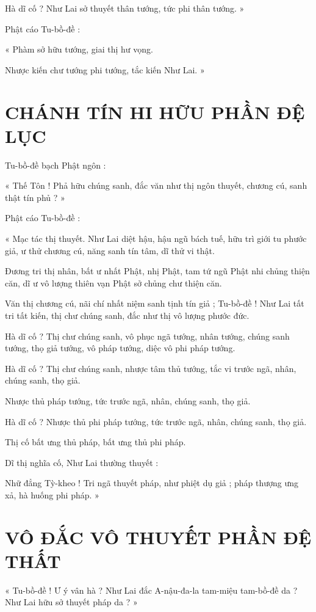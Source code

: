	Hà dĩ cố ? Như Lai sở thuyết thân tướng, tức phi thân tướng. »
	
	Phật cáo Tu-bồ-đề :
	
	« Phàm sở hữu tướng, giai thị hư vọng. 
	
	Nhược kiến chư tướng phi tướng, tắc kiến Như Lai. »
	
	\section*{CHÁNH TÍN HI HỮU PHẦN ĐỆ LỤC}
	
	Tu-bồ-đề bạch Phật ngôn :
	
	« Thế Tôn ! Phả hữu chúng sanh, đắc văn như thị ngôn thuyết, chương cú, sanh thật tín phủ ? »
	
	Phật cáo Tu-bồ-đề :
	
	« Mạc tác thị thuyết. Như Lai diệt hậu, hậu ngũ bách tuế, hữu trì giới tu phước giả, ư thử chương cú, năng sanh tín tâm, dĩ thử vi thật. 
	
	Đương tri thị nhân, bất ư nhất Phật, nhị Phật, tam tứ ngũ Phật nhi chủng thiện căn, dĩ ư vô lượng thiên vạn Phật sở chủng chư thiện căn. 
	
	Văn thị chương cú, nãi chí nhất niệm sanh tịnh tín giả ; Tu-bồ-đề ! Như Lai tất tri tất kiến, thị chư chúng sanh, đắc như thị vô lượng phước đức. 
	
	Hà dĩ cố ? Thị chư chúng sanh, vô phục ngã tướng, nhân tướng, chúng sanh tướng, thọ giả tướng, vô pháp tướng, diệc vô phi pháp tướng. 
	
	Hà dĩ cố ? Thị chư chúng sanh, nhược tâm thủ tướng, tắc vi trước ngã, nhân, chúng sanh, thọ giả. 
	
	Nhược thủ pháp tướng, tức trước ngã, nhân, chúng sanh, thọ giả.
	
	Hà dĩ cố ? Nhược thủ phi pháp tướng, tức trước ngã, nhân, chúng sanh, thọ giả. 
	
	Thị cố bất ưng thủ pháp, bất ưng thủ phi pháp. 
	
	Dĩ thị nghĩa cố, Như Lai thường thuyết : 
	
	Nhữ đẳng Tỳ-kheo ! Tri ngã thuyết pháp, như phiệt dụ giả ; pháp thượng ưng xả, hà huống phi pháp. »
	
	\section*{VÔ ĐẮC VÔ THUYẾT PHẦN ĐỆ THẤT}
	
	« Tu-bồ-đề ! Ư ý vân hà ? Như Lai đắc A-nậu-đa-la tam-miệu tam-bồ-đề da ? Như Lai hữu sở thuyết pháp da ? »
	
